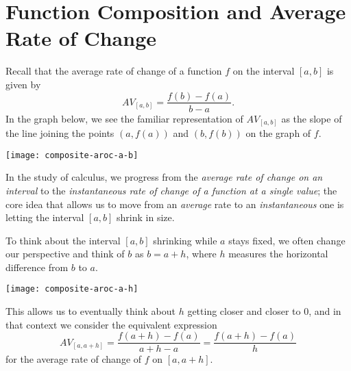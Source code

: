 \documentclass{ximera}
\begin{document}
\section{Function Composition and Average Rate of Change}

Recall that the average rate of change of a function \(f\) on the interval \([a,b]\) is given by%
\begin{equation*}
AV_{[a,b]} = \frac{f(b) - f(a)}{b-a}\text{.}
\end{equation*}
In the graph below, we see the familiar representation of \(AV_{[a,b]}\) as the slope of the line joining the points \((a,f(a))\) and \((b,f(b))\) on the graph of \(f\). 

\begin{image}
\texttt{[image: composite-aroc-a-b]}
\end{image}

 In the study of calculus, we progress from the \emph{average rate of change on an interval} to the \emph{instantaneous rate of change of a function at a single value}; the core idea that allows us to move from an \emph{average} rate to an \emph{instantaneous} one is letting the interval \([a,b]\) shrink in size.

To think about the interval \([a,b]\) shrinking while \(a\) stays fixed, we often change our perspective and think of \(b\) as \(b = a + h\), where \(h\) measures the horizontal difference from \(b\) to \(a\).  

\begin{image}
\texttt{[image: composite-aroc-a-h]}
\end{image}

This allows us to eventually think about \(h\) getting closer and closer to \(0\), and in that context we consider the equivalent expression%
\begin{equation*}
AV_{[a,a+h]} = \frac{f(a+h) - f(a)}{a+h-a} = \frac{f(a+h) - f(a)}{h} 
\end{equation*}
for the average rate of change of \(f\) on	\([a,a+h]\).%
\end{document}
